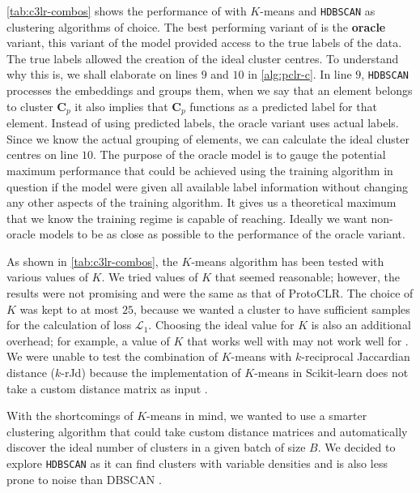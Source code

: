 \cref{tab:c3lr-combos} shows the performance of \ccclr{} with $K$-means and \texttt{HDBSCAN} as clustering algorithms of choice. The best performing variant of \ccclr{} is the \textbf{oracle} variant, this variant of the model provided access to the true labels of the data. The true labels allowed the creation of the ideal cluster centres. To understand why this is, we shall elaborate on lines $9$ and $10$ in \cref{alg:pclr-c}. In line $9$, \texttt{HDBSCAN} processes the embeddings and groups them, when we say that an element belongs to cluster $\symbf{C}_p$ it also implies that $\symbf{C}_p$ functions as a predicted label for that element. 
Instead of using predicted labels, the oracle variant uses actual labels. Since we know the actual grouping of elements, we can calculate the ideal cluster centres on line $10$. 
The purpose of the oracle model is to gauge the potential maximum performance that could be achieved using the training algorithm in question if the model were given all available label information without changing any other aspects of the training algorithm. 
It gives us a theoretical maximum that we know the training regime is capable of reaching. Ideally we want non-oracle models to be as close as possible to the performance of the oracle variant.

As shown in \cref{tab:c3lr-combos}, the $K$-means algorithm has been tested with various values of $K$. We tried values of $K$ that seemed reasonable; however, the results were not promising and were the same as that of ProtoCLR. The choice of $K$ was kept to at most $25$, because we wanted a cluster to have sufficient samples for the calculation of loss $\mathcal{L}_1$.
Choosing the ideal value for $K$ is also an additional overhead; for example, a value of $K$ that works well with \miniImagenet{} may not work well for \tieredImagenet{}.
We were unable to test the combination of $K$-means with $k$-reciprocal Jaccardian distance ($k$-rJd) because the implementation of $K$-means in Scikit-learn does not take a custom distance matrix as input \parencite{scikit-learn}.

With the shortcomings of $K$-means in mind, we wanted to use a smarter clustering algorithm that could take custom distance matrices and automatically discover the ideal number of clusters in a given batch of size $B$. We decided to explore \texttt{HDBSCAN} \parencite{McInnes2017Hdbscan:Clustering} as it can find clusters with variable densities and is also less prone to noise than DBSCAN \parencite{ester1996density,schubert2017dbscan}. 

